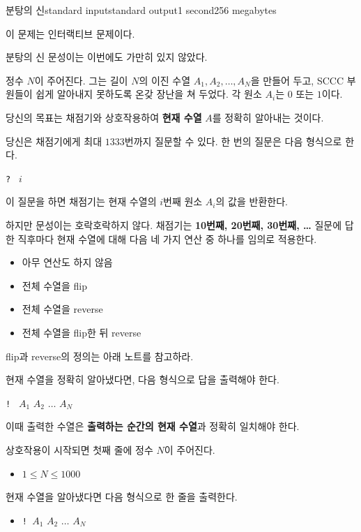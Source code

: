 \begin{problem}{분탕의 신}{standard input}{standard output}{1 second}{256 megabytes}

이 문제는 인터랙티브 문제이다.

분탕의 신 문성이는 이번에도 가만히 있지 않았다.

정수 $N$이 주어진다.
그는 길이 $N$의 이진 수열 $A_1, A_2, \dots, A_N$을 만들어 두고, SCCC 부원들이 쉽게 알아내지 못하도록 온갖 장난을 쳐 두었다.
각 원소 $A_i$는 $0$ 또는 $1$이다.

당신의 목표는 채점기와 상호작용하여 \textbf{현재 수열} $A$를 정확히 알아내는 것이다.

당신은 채점기에게 최대 $1333$번까지 질문할 수 있다.
한 번의 질문은 다음 형식으로 한다.
\begin{center}
\texttt{? } $i$
\end{center}

이 질문을 하면 채점기는 현재 수열의 $i$번째 원소 $A_i$의 값을 반환한다.

하지만 문성이는 호락호락하지 않다.
채점기는 \textbf{10번째, 20번째, 30번째, \dots} 질문에 답한 직후마다 현재 수열에 대해 다음 네 가지 연산 중 하나를 임의로 적용한다.
\begin{itemize}
    \item 아무 연산도 하지 않음
    \item 전체 수열을 flip
    \item 전체 수열을 reverse
    \item 전체 수열을 flip한 뒤 reverse
\end{itemize}

flip과 reverse의 정의는 아래 노트를 참고하라.

현재 수열을 정확히 알아냈다면, 다음 형식으로 답을 출력해야 한다.
\begin{center}
\texttt{! } $A_1$ $A_2$ $\dots$ $A_N$
\end{center}

이때 출력한 수열은 \textbf{출력하는 순간의 현재 수열}과 정확히 일치해야 한다.

\InputFile
상호작용이 시작되면 첫째 줄에 정수 $N$이 주어진다.

\begin{itemize}
    \item $1 \le N \le 1000$
\end{itemize}

\OutputFile
현재 수열을 알아냈다면 다음 형식으로 한 줄을 출력한다.

\begin{itemize}
    \item \texttt{! }$A_1$ $A_2$ $\dots$ $A_N$
\end{itemize}


\end{problem}
